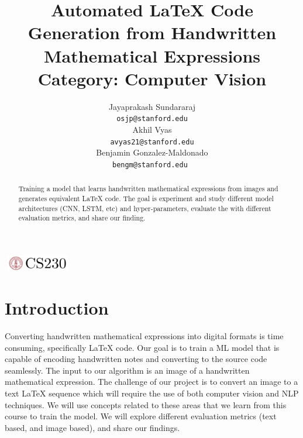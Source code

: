 \documentclass{article}
\title{Automated LaTeX Code Generation from Handwritten Mathematical Expressions \\
Category: Computer Vision}
\author{
  Jayaprakash Sundararaj \\
  \texttt{osjp@stanford.edu}  \\
  \AND
  Akhil Vyas \\
  \texttt{avyas21@stanford.edu}  \\
  \AND
  Benjamin Gonzalez-Maldonado \\
  \texttt{bengm@stanford.edu } \\
}
\begin{document}

\begin{center}
\includegraphics[width=3cm, height=0.7cm]{CS230}
\end{center}

\maketitle

\begin{abstract}
Training a model that learns handwritten mathematical expressions from images and generates equivalent LaTeX code. The goal is experiment and study different model architectures (CNN, LSTM, etc) and hyper-parameters, evaluate the with different evaluation metrics, and share our finding.
\end{abstract}

\section{Introduction}	

Converting handwritten mathematical expressions into digital formats is time consuming, specifically LaTeX code. Our goal is to train a ML model that is capable of encoding handwritten notes and converting to the source code seamlessly. The input to our algorithm is an image of a handwritten mathematical expression. The challenge of our project is to convert an image to a text LaTeX sequence which will require the use of both computer vision and NLP techniques. We will use concepts related to these areas that we learn from this course to train the model. We will explore different evaluation metrics (text based, and image based), and share our findings.

\end{document}
